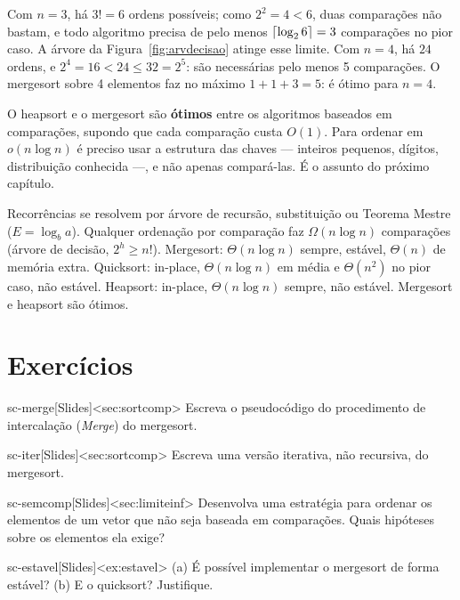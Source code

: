 \begin{exemplo}[O limite para $n=3$ e $n=4$]\label{ex:limite34}
Com $n=3$, há $3!=6$ ordens possíveis; como $2^2=4<6$, duas comparações não bastam, e todo algoritmo precisa de pelo menos $\lceil\log_26\rceil=3$ comparações no pior caso. A árvore da Figura~\ref{fig:arvdecisao} atinge esse limite. Com $n=4$, há $24$ ordens, e $2^4=16<24\le32=2^5$: são necessárias pelo menos 5 comparações. O mergesort sobre 4 elementos faz no máximo $1+1+3=5$: é ótimo para $n=4$.
\end{exemplo}

\begin{cor}
O heapsort e o mergesort são \textbf{ótimos} entre os algoritmos baseados em comparações, supondo que cada comparação custa $O(1)$. Para ordenar em $o(n\log n)$ é preciso usar a estrutura das chaves --- inteiros pequenos, dígitos, distribuição conhecida ---, e não apenas compará-las. É o assunto do próximo capítulo.
\end{cor}

\begin{chave}
Recorrências se resolvem por árvore de recursão, substituição ou Teorema Mestre ($E=\log_ba$). Qualquer ordenação por comparação faz $\Omega(n\log n)$ comparações (árvore de decisão, $2^h\ge n!$). Mergesort: $\Theta(n\log n)$ sempre, estável, $\Theta(n)$ de memória extra. Quicksort: in-place, $\Theta(n\log n)$ em média e $\Theta(n^2)$ no pior caso, não estável. Heapsort: in-place, $\Theta(n\log n)$ sempre, não estável. Mergesort e heapsort são ótimos.
\end{chave}

\section{Exercícios}
\excurso
\begin{exercicio}{sc-merge}[Slides]<sec:sortcomp>
Escreva o pseudocódigo do procedimento de intercalação (\emph{Merge}) do mergesort.
\end{exercicio}
\begin{exercicio}{sc-iter}[Slides]<sec:sortcomp>
Escreva uma versão iterativa, não recursiva, do mergesort.
\end{exercicio}
\begin{exercicio}{sc-semcomp}[Slides]<sec:limiteinf>
Desenvolva uma estratégia para ordenar os elementos de um vetor que não seja baseada em comparações. Quais hipóteses sobre os elementos ela exige?
\end{exercicio}
\begin{exercicio}{sc-estavel}[Slides]<ex:estavel>
(a) É possível implementar o mergesort de forma estável? (b) E o quicksort? Justifique.
\end{exercicio}

